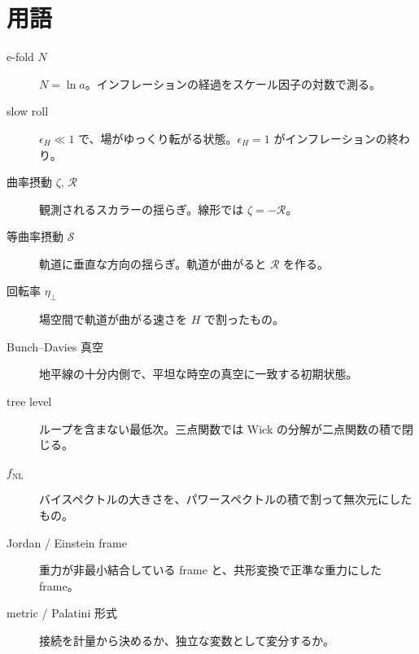 \documentclass[a4paper,11pt]{ltjsarticle}
\newcommand{\fnl}{f_{\mathrm{NL}}}
\begin{document}
\section{用語}

\begin{description}
\item[e-fold $N$] $N=\ln a$。インフレーションの経過をスケール因子の対数で測る。
\item[slow roll] $\epsilon_H\ll1$ で、場がゆっくり転がる状態。$\epsilon_H=1$ がインフレーションの終わり。
\item[曲率摂動 $\zeta$, $\mathcal R$] 観測されるスカラーの揺らぎ。線形では $\zeta=-\mathcal R$。
\item[等曲率摂動 $\mathcal S$] 軌道に垂直な方向の揺らぎ。軌道が曲がると $\mathcal R$ を作る。
\item[回転率 $\eta_\perp$] 場空間で軌道が曲がる速さを $H$ で割ったもの。
\item[Bunch--Davies 真空] 地平線の十分内側で、平坦な時空の真空に一致する初期状態。
\item[tree level] ループを含まない最低次。三点関数では Wick の分解が二点関数の積で閉じる。
\item[$\fnl$] バイスペクトルの大きさを、パワースペクトルの積で割って無次元にしたもの。
\item[Jordan / Einstein frame] 重力が非最小結合している frame と、共形変換で正準な重力にした frame。
\item[metric / Palatini 形式] 接続を計量から決めるか、独立な変数として変分するか。
\end{description}



\end{document}
